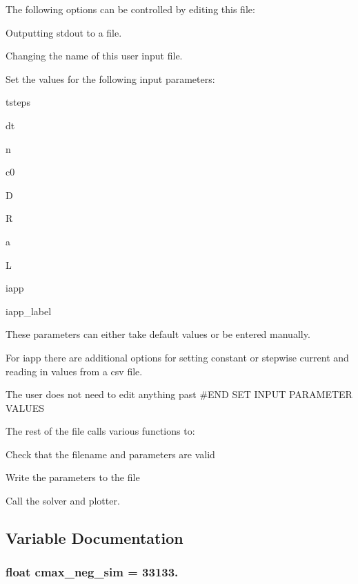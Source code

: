 The following options can be controlled by editing this file\-:
\begin{DoxyItemize}
\item Outputting stdout to a file.
\item Changing the name of this user input file.
\item Set the values for the following input parameters\-:
\item tsteps
\item dt
\item n
\item c0
\item D
\item R
\item a
\item L
\item iapp
\item iapp\-\_\-label
\item These parameters can either take default values or be entered manually.
\item For iapp there are additional options for setting constant or stepwise current and reading in values from a csv file.
\end{DoxyItemize}

The user does not need to edit anything past \#\-E\-N\-D S\-E\-T I\-N\-P\-U\-T P\-A\-R\-A\-M\-E\-T\-E\-R V\-A\-L\-U\-E\-S

The rest of the file calls various functions to\-:
\begin{DoxyItemize}
\item Check that the filename and parameters are valid
\item Write the parameters to the file
\item Call the solver and plotter. 
\end{DoxyItemize}

\subsection{Variable Documentation}
\hypertarget{namespaceuser__input_ab7633a5e9c70aabfe6992e4fe521a1f9}{
\subsubsection[{cmax\-\_\-neg\-\_\-sim}]{\setlength{\rightskip}{0pt plus 5cm}float cmax\-\_\-neg\-\_\-sim = 33133.}}\label{namespaceuser__input_ab7633a5e9c70aabfe6992e4fe521a1f9}


